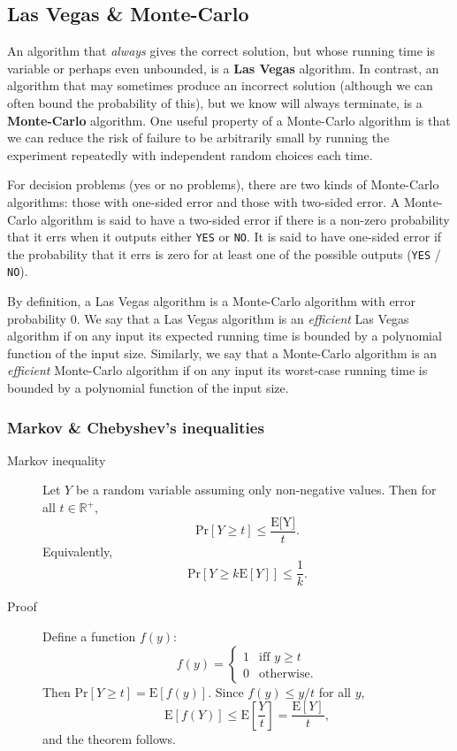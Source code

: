 \subsection{Las Vegas \& Monte-Carlo}
An algorithm that \textit{always} gives the correct solution, but whose running time is variable or perhaps even
unbounded, is a \textbf{Las Vegas} algorithm. In contrast, an algorithm that may sometimes produce an incorrect
solution (although we can often bound the probability of this), but we know will always terminate, is a
\textbf{Monte-Carlo} algorithm. One useful property of a Monte-Carlo algorithm is that we can reduce the risk of
failure to be arbitrarily small by running the experiment repeatedly with
independent random choices each time.

For decision problems (yes or no problems), there are two kinds of Monte-Carlo
algorithms: those with one-sided error and those with two-sided error. A
Monte-Carlo algorithm is said to have a two-sided error if there is a non-zero
probability that it errs when it outputs either \texttt{YES} or \texttt{NO}. It is said
to have one-sided error if the probability that it errs is zero for at least one of the
possible outputs (\texttt{YES} / \texttt{NO}).

By definition, a Las Vegas algorithm is a Monte-Carlo algorithm with error
probability $0$. We say that a Las Vegas algorithm is an \textit{efficient}
Las Vegas algorithm if on any input its expected running time is bounded by a
polynomial function of the input size. Similarly, we say that a Monte-Carlo
algorithm is an \textit{efficient} Monte-Carlo algorithm if on any input its
worst-case running time is bounded by a polynomial function of the input size.

\subsubsection{Markov \& Chebyshev's inequalities}
\begin{description}
\item[Markov inequality] Let $Y$ be a random variable assuming only non-negative
  values. Then for all $t \in \mathbb{R}^+$,
  \[
    \text{Pr}[Y \geq t] \leq \frac{\text{E[Y]}}{t}.
  \]
  Equivalently,
  \[
    \text{Pr}[Y \geq k\text{E}[Y]] \leq \frac{1}{k}.
  \]
\item[Proof] Define a function $f(y)$:
  \[
   f(y) = \begin{cases}
     1 & \text{iff } y \geq t\\
     0 & \text{otherwise.}
   \end{cases}
  \]
  Then $\text{Pr}[Y \geq t] = \text{E}[f(y)]$. Since $f(y) \leq y/t$ for all $y$,
  \[
    \text{E}[f(Y)] \leq \text{E}\left [\frac{Y}{t} \right ] = \frac{\text{E}[Y]}{t},
  \]
  and the theorem follows.
\end{description}

